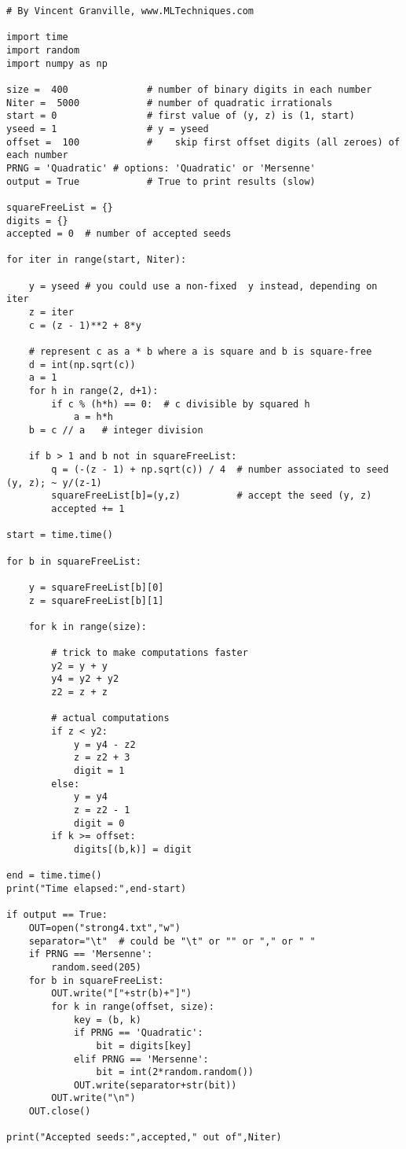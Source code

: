 \documentclass[oneside,10pt]{book}
\begin{document}
\begin{lstlisting}
# By Vincent Granville, www.MLTechniques.com
 
import time
import random
import numpy as np

size =  400              # number of binary digits in each number
Niter =  5000            # number of quadratic irrationals
start = 0                # first value of (y, z) is (1, start)
yseed = 1                # y = yseed
offset =  100            #    skip first offset digits (all zeroes) of each number
PRNG = 'Quadratic' # options: 'Quadratic' or 'Mersenne' 
output = True            # True to print results (slow)

squareFreeList = {}
digits = {}
accepted = 0  # number of accepted seeds

for iter in range(start, Niter): 

    y = yseed # you could use a non-fixed  y instead, depending on iter
    z = iter
    c = (z - 1)**2 + 8*y 

    # represent c as a * b where a is square and b is square-free
    d = int(np.sqrt(c))
    a = 1 
    for h in range(2, d+1):
        if c % (h*h) == 0:  # c divisible by squared h
            a = h*h
    b = c // a   # integer division

    if b > 1 and b not in squareFreeList:
        q = (-(z - 1) + np.sqrt(c)) / 4  # number associated to seed (y, z); ~ y/(z-1)
        squareFreeList[b]=(y,z)          # accept the seed (y, z)
        accepted += 1

start = time.time()

for b in squareFreeList: 

    y = squareFreeList[b][0]
    z = squareFreeList[b][1]
         
    for k in range(size): 

        # trick to make computations faster
        y2 = y + y   
        y4 = y2 + y2
        z2 = z + z

        # actual computations
        if z < y2:
            y = y4 - z2
            z = z2 + 3
            digit = 1 
        else:
            y = y4
            z = z2 - 1
            digit = 0
        if k >= offset:
            digits[(b,k)] = digit

end = time.time()
print("Time elapsed:",end-start)

if output == True:
    OUT=open("strong4.txt","w")
    separator="\t"  # could be "\t" or "" or "," or " "
    if PRNG == 'Mersenne':
        random.seed(205) 
    for b in squareFreeList:
        OUT.write("["+str(b)+"]")
        for k in range(offset, size):
            key = (b, k)
            if PRNG == 'Quadratic':
                bit = digits[key] 
            elif PRNG == 'Mersenne':
                bit = int(2*random.random())
            OUT.write(separator+str(bit))
        OUT.write("\n")
    OUT.close()

print("Accepted seeds:",accepted," out of",Niter)


\end{lstlisting}
\end{document}
